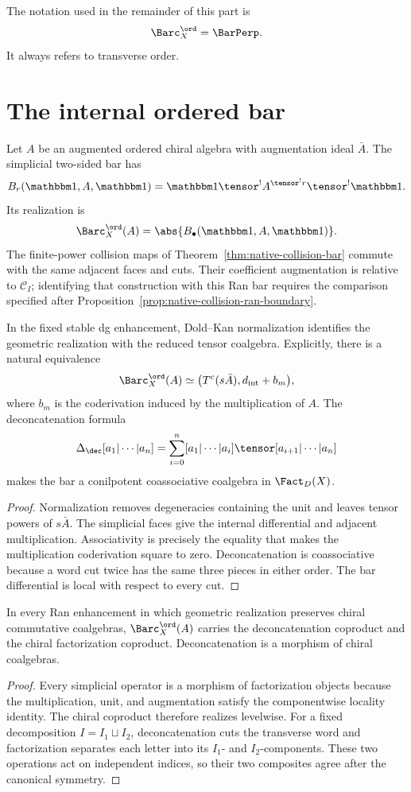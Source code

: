 The notation used in the remainder of this part is
\[
 \Barc_X^{\ord}=\BarPerp.
\]
It always refers to transverse order.



\chapter{The internal ordered bar}
Let $A$ be an augmented ordered chiral algebra with augmentation ideal $\bar A$. The simplicial two-sided bar has
\[
 B_r(\mathbbm1,A,\mathbbm1)=
 \mathbbm1\tensor^! A^{\tensor^!r}\tensor^!\mathbbm1.
\]
Its realization is
\[
\Barc_X^{\ord}(A)=\abs{B_\bullet(\mathbbm1,A,\mathbbm1)}.
\]
The finite-power collision maps of
Theorem~\ref{thm:native-collision-bar} commute with the same adjacent
faces and cuts. Their coefficient augmentation is relative to
$\mathcal C_I$; identifying that construction with this Ran bar
requires the comparison specified after
Proposition~\ref{prop:native-collision-ran-boundary}.

\begin{theorem}
In the fixed stable dg enhancement, Dold--Kan normalization identifies the geometric realization with the reduced tensor coalgebra. Explicitly, there is a natural equivalence
\[
 \Barc_X^{\ord}(A)
 \simeq
 \bigl(T^c(s\bar A),d_{\mathrm{int}}+b_m\bigr),
\]
where $b_m$ is the coderivation induced by the multiplication of $A$. The deconcatenation formula
\[
 \Delta_{\dec}[a_1|\cdots|a_n]
 =\sum_{i=0}^n[a_1|\cdots|a_i]\tensor[a_{i+1}|\cdots|a_n]
\]
makes the bar a conilpotent coassociative coalgebra in $\Fact_D(X)$.
\end{theorem}
\begin{proof}
Normalization removes degeneracies containing the unit and leaves tensor powers of $s\bar A$. The simplicial faces give the internal differential and adjacent multiplication. Associativity is precisely the equality that makes the multiplication coderivation square to zero. Deconcatenation is coassociative because a word cut twice has the same three pieces in either order. The bar differential is local with respect to every cut.
\end{proof}

\begin{theorem}
In every Ran enhancement in which geometric realization preserves chiral commutative coalgebras, $\Barc_X^{\ord}(A)$ carries the deconcatenation coproduct and the chiral factorization coproduct. Deconcatenation is a morphism of chiral coalgebras.
\end{theorem}
\begin{proof}
Every simplicial operator is a morphism of factorization objects because the multiplication, unit, and augmentation satisfy the componentwise locality identity. The chiral coproduct therefore realizes levelwise. For a fixed decomposition $I=I_1\sqcup I_2$, deconcatenation cuts the transverse word and factorization separates each letter into its $I_1$- and $I_2$-components. These two operations act on independent indices, so their two composites agree after the canonical symmetry.
\end{proof}

